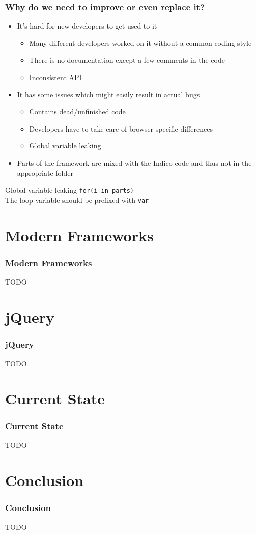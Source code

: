 \documentclass{beamer}
\begin{document}
\begin{frame}
  \frametitle{Why do we need to improve or even replace it?}
  \begin{itemize}
    \item It's hard for new developers to get used to it
      \begin{itemize}
        \item Many different developers worked on it without a common coding style
        \item There is no documentation except a few comments in the code
        \item Inconsistent API
      \end{itemize}
    \item It has some issues which might easily result in actual bugs
      \begin{itemize}
        \item Contains dead/unfinished code
        \item Developers have to take care of browser-specific differences
        \item Global variable leaking
      \end{itemize}
    \item Parts of the framework are mixed with the Indico code and thus not in the appropriate
      folder
  \end{itemize}
  \begin{alertblock}{Global variable leaking}
    \lstinline{for(i in parts)}\\
    The loop variable should be prefixed with \lstinline{var}
  \end{alertblock}
\end{frame}

\section{Modern Frameworks}
\begin{frame}
  \frametitle{Modern Frameworks}
  TODO
\end{frame}

\section{jQuery}
\begin{frame}
  \frametitle{jQuery}
  TODO
\end{frame}

\section{Current State}
\begin{frame}
  \frametitle{Current State}
  TODO
\end{frame}

\section{Conclusion}
\begin{frame}
  \frametitle{Conclusion}
  TODO
\end{frame}
\end{document}
